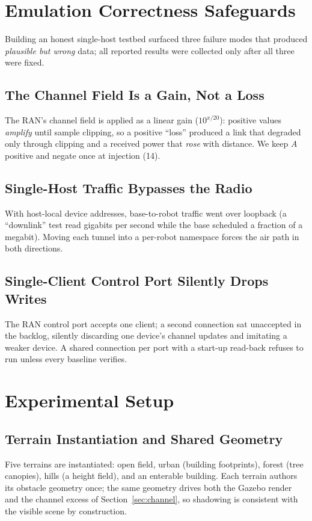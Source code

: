 \documentclass[conference]{IEEEtran}
\begin{document}
\section{Emulation Correctness Safeguards}
\label{sec:safe}
Building an honest single-host testbed surfaced three failure modes that produced
\emph{plausible but wrong} data; all reported results were collected only after all
three were fixed.

\subsection{The Channel Field Is a Gain, Not a Loss}
The RAN's channel field is applied as a linear gain ($10^{x/20}$): positive values
\emph{amplify} until sample clipping, so a positive ``loss'' produced a link that
degraded only through clipping and a received power that \emph{rose} with distance. We
keep $A$ positive and negate once at injection (14).

\subsection{Single-Host Traffic Bypasses the Radio}
With host-local device addresses, base-to-robot traffic went over loopback (a
``downlink'' test read gigabits per second while the base scheduled a fraction of a
megabit). Moving each tunnel into a per-robot namespace forces the air path in both
directions.

\subsection{Single-Client Control Port Silently Drops Writes}
The RAN control port accepts one client; a second connection sat unaccepted in the
backlog, silently discarding one device's channel updates and imitating a weaker
device. A shared connection per port with a start-up read-back refuses to run unless
every baseline verifies.

\section{Experimental Setup}
\label{sec:setup}

\subsection{Terrain Instantiation and Shared Geometry}
Five terrains are instantiated: open field, urban (building footprints), forest (tree
canopies), hills (a height field), and an enterable building. Each terrain authors its
obstacle geometry once; the same geometry drives both the Gazebo render and the
channel excess of Section~\ref{sec:channel}, so shadowing is consistent with the
visible scene by construction.
\end{document}
